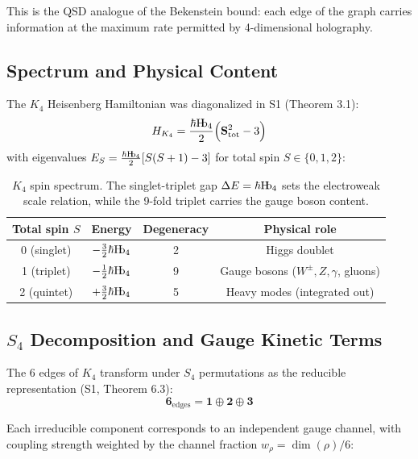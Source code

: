 \documentclass[11pt,a4paper]{article}
\theoremstyle{definition}
\theoremstyle{remark}
\newcommand{\Hb}{\textnormal{H\kern-0.3em b}}
\newcommand{\Hbfour}{\Hb_4}
\begin{document}
This is the QSD analogue of the Bekenstein bound: each edge of the graph carries information at the maximum rate permitted by 4-dimensional holography.

\subsection{Spectrum and Physical Content}

The $K_4$ Heisenberg Hamiltonian was diagonalized in S1 (Theorem 3.1):
\begin{equation}
H_{K_4} = \frac{\hbar\Hbfour}{2}\Big(\mathbf{S}_{\mathrm{tot}}^2 - 3\Big)
\end{equation}
with eigenvalues $E_S = \tfrac{\hbar\Hbfour}{2}[S(S+1) - 3]$ for total spin $S \in \{0, 1, 2\}$:

\begin{table}[H]
\centering
\begin{tabular}{cccc}
\toprule
\textbf{Total spin $S$} & \textbf{Energy} & \textbf{Degeneracy} & \textbf{Physical role} \\
\midrule
0 (singlet) & $-\tfrac{3}{2}\hbar\Hbfour$ & 2 & Higgs doublet \\
1 (triplet) & $-\tfrac{1}{2}\hbar\Hbfour$ & 9 & Gauge bosons ($W^\pm, Z, \gamma$, gluons) \\
2 (quintet) & $+\tfrac{3}{2}\hbar\Hbfour$ & 5 & Heavy modes (integrated out) \\
\bottomrule
\end{tabular}
\caption{$K_4$ spin spectrum. The singlet-triplet gap $\Delta E = \hbar\Hbfour$ sets the electroweak scale relation, while the 9-fold triplet carries the gauge boson content.}
\label{tab:K4spectrum}
\end{table}

\subsection{$S_4$ Decomposition and Gauge Kinetic Terms}
\label{ssec:gauge_kinetic}

The 6 edges of $K_4$ transform under $S_4$ permutations as the reducible representation (S1, Theorem 6.3):
\begin{equation}
\mathbf{6}_{\mathrm{edges}} = \mathbf{1} \oplus \mathbf{2} \oplus \mathbf{3}
\end{equation}

Each irreducible component corresponds to an independent gauge channel, with coupling strength weighted by the channel fraction $w_\rho = \dim(\rho)/6$:
\end{document}
